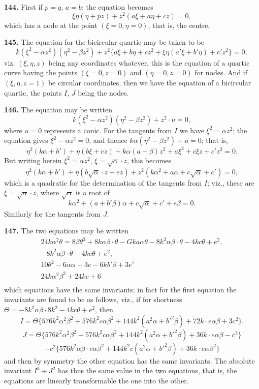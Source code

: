 \documentclass[12pt,a4paper]{article}
\theoremstyle{definition}
\begin{document}
\noindent\textbf{144.} First if $p = q$, $a = b$: the equation becomes
\[
\xi\eta(\eta + pz) + z^2(a\xi + a\eta + cz) = 0,
\]
which has a node at the point $(\xi = 0, \eta = 0)$, that is, the centre.

\newpage
\noindent\textbf{145.} The equation for the bicircular quartic may be taken to be
\[
k(\xi^2 - \alpha z^2)(\eta^2 - \beta z^2) + z^2\{a\xi + b\eta + cz^2 + \xi\eta(a'\xi + b'\eta) + c'z^2\} = 0,
\]
viz. $(\xi, \eta, z)$ being any coordinates whatever, this is the equation of a quartic curve
having the points $(\xi = 0, z = 0)$ and $(\eta = 0, z = 0)$ for nodes. And if $(\xi, \eta, z = 1)$
be circular coordinates, then we have the equation of a bicircular quartic, the points
$I$, $J$ being the nodes.

\noindent\textbf{146.} The equation may be written
\[
k(\xi^2 - \alpha z^2)(\eta^2 - \beta z^2) + z^2\cdot u = 0,
\]
where $u = 0$ represents a conic. For the tangents from $I$ we have $\xi^2 = \alpha z^2$; the
equation gives $\xi^2 - \alpha z^2 = 0$, and thence $k\alpha(\eta^2 - \beta z^2) + u = 0$; that is,
\[
\eta^2(k\alpha + b') + \eta(b\xi + ez) + k\alpha(a - \beta)z^2 + a\xi^2 + c\xi z + c'z^2 = 0.
\]
But writing herein $\xi^2 = \alpha z^2$, $\xi = \sqrt{\alpha}\cdot z$, this becomes
\[
\eta^2(k\alpha + b') + \eta(b\sqrt{\alpha}\cdot z + ez) + z^2(k\alpha^2 + a\alpha + c\sqrt{\alpha} + c') = 0,
\]
which is a quadratic for the determination of the tangents from $I$; viz., these are
$\xi = \sqrt{\alpha}\cdot z$, where $\sqrt{\alpha}$ is a root of
\[
k\alpha^2 + (a + b'\beta)\alpha + c\sqrt{\alpha} + c' + e\beta = 0.
\]
Similarly for the tangents from $J$.

\newpage
\noindent\textbf{147.} The two equations may be written
\[
\begin{array}{c}
24k\alpha^2\theta = 8\beta\theta^3 + 8k\alpha\beta\cdot\theta - Gka\alpha\theta - 8k^2\alpha\beta\cdot\theta - 4kc\theta + e^2, \\
-8k^2\alpha\beta\cdot\theta - 4kc\theta + e^2, \\
10\theta^2 - 6\alpha\alpha + 3e - 6kb'\beta + 3e' \\
24k\alpha^2\beta^2 + 24kc + 6 \\
\end{array}
\]
which equations have the same invariants; in fact for the first equation the invariants
are found to be as follows, viz., if for shortness $\Theta = -8k^2\alpha\beta\cdot8k^2 - 4kc\theta + e^2$, then
\[
I = \Theta\{576k^2\alpha^2\beta^2 + 576k^2c\alpha\beta^2 + 144k^2(a^2\alpha + b'^2\beta) + 72k\cdot e\alpha\beta + 3c^2\}.
\]
\[
J = \Theta\{576k^2\alpha^2\beta^2 + 576k^2c\alpha\beta^2 + 144k^2(a^2\alpha + b'^2\beta) + 36k\cdot e\alpha\beta - c^3\}
\]
\[
- c^2\{576k^2\alpha\beta\cdot c\alpha\beta^2 + 144k^2c(a^2\alpha + b'^2\beta) + 36k\cdot e\alpha\beta^2\}
\]
and then by symmetry the other equation has the same invariants. The absolute
invariant $I^3 \div J^2$ has thus the same value in the two equations, that is, the equations
are linearly transformable the one into the other.
\end{document}
